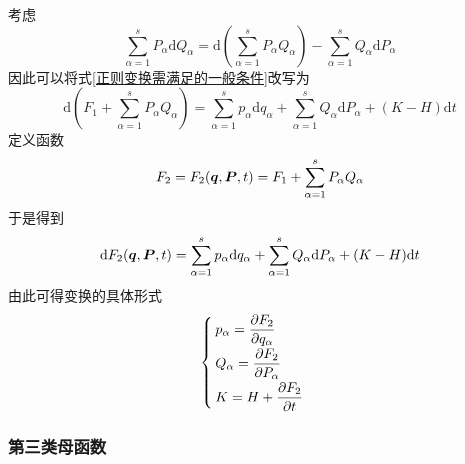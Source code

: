 考虑
\begin{equation*}
	\sum_{\alpha=1}^s P_\alpha \mathrm{d} Q_\alpha = \mathrm{d} \left(\sum_{\alpha=1}^s P_\alpha Q_\alpha\right) - \sum_{\alpha=1}^s Q_\alpha \mathrm{d} P_\alpha
\end{equation*}
因此可以将式\eqref{正则变换需满足的一般条件}改写为
\begin{equation*}
	\mathrm{d} \left(F_1 + \sum_{\alpha=1}^s P_\alpha Q_\alpha\right) = \sum_{\alpha=1}^s p_\alpha \mathrm{d} q_\alpha + \sum_{\alpha=1}^s Q_\alpha \mathrm{d} P_\alpha + (K-H) \mathrm{d} t
\end{equation*}
定义函数
\begin{equation}
	F_2 = F_2(\boldsymbol{q},\boldsymbol{P},t) = F_1 + \sum_{\alpha=1}^s P_\alpha Q_\alpha
	\label{第二类母函数}
\end{equation}
于是得到
\begin{equation}
	\mathrm{d} F_2(\boldsymbol{q},\boldsymbol{P},t) = \sum_{\alpha=1}^s p_\alpha \mathrm{d} q_\alpha + \sum_{\alpha=1}^s Q_\alpha \mathrm{d} P_\alpha + (K-H) \mathrm{d} t
	\label{第二类母函数下的正则变换}
\end{equation}
由此可得变换的具体形式
\begin{equation}
	\begin{cases}
		\displaystyle p_\alpha = \frac{\partial F_2}{\partial q_\alpha} \\[1.5ex]
		\displaystyle Q_\alpha = \frac{\partial F_2}{\partial P_\alpha} \\[1.5ex]
		\displaystyle K = H + \frac{\partial F_2}{\partial t}
	\end{cases}
\end{equation}

\subsubsection{第三类母函数}


